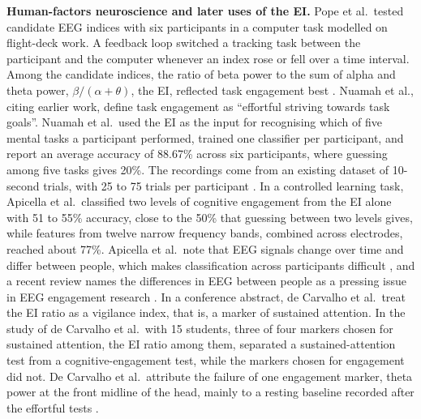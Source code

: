 \documentclass[12pt,a4paper]{report}
\begin{document}
\textbf{Human-factors neuroscience and later uses of the EI.} Pope et al.\ tested candidate EEG indices with six participants in a computer task modelled on flight-deck work. A feedback loop switched a tracking task between the participant and the computer whenever an index rose or fell over a time interval. Among the candidate indices, the ratio of beta power to the sum of alpha and theta power, \(\beta/(\alpha+\theta)\), the EI, reflected task engagement best \cite{pope_biocybernetic_1995-3}. Nuamah et al., citing earlier work, define task engagement as ``effortful striving towards task goals''. Nuamah et al.\ used the EI as the input for recognising which of five mental tasks a participant performed, trained one classifier per participant, and report an average accuracy of 88.67\% across six participants, where guessing among five tasks gives 20\%. The recordings come from an existing dataset of 10-second trials, with 25 to 75 trials per participant \cite{nuamah_electroencephalography_2017}. In a controlled learning task, Apicella et al.\ classified two levels of cognitive engagement from the EI alone with 51 to 55\% accuracy, close to the 50\% that guessing between two levels gives, while features from twelve narrow frequency bands, combined across electrodes, reached about 77\%. Apicella et al.\ note that EEG signals change over time and differ between people, which makes classification across participants difficult \cite{apicella_eeg-based_2022}, and a recent review names the differences in EEG between people as a pressing issue in EEG engagement research \cite{bellos_methods_2025}. In a conference abstract, de Carvalho et al.\ treat the EI ratio as a vigilance index, that is, a marker of sustained attention. In the study of de Carvalho et al.\ with 15 students, three of four markers chosen for sustained attention, the EI ratio among them, separated a sustained-attention test from a cognitive-engagement test, while the markers chosen for engagement did not. De Carvalho et al.\ attribute the failure of one engagement marker, theta power at the front midline of the head, mainly to a resting baseline recorded after the effortful tests \cite{de_carvalho_selection_2026}.
\end{document}
